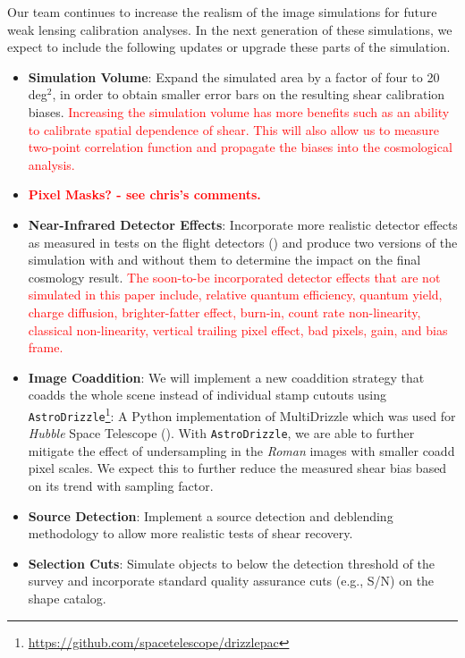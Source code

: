 \documentclass[fleqn,usenatbib]{mnras}
\begin{document}
Our team continues to increase the realism of the image simulations for future weak lensing calibration analyses. In the next generation of these simulations, we expect to include the following updates or upgrade these parts of the simulation. 
\begin{itemize}
    \setlength\itemsep{1em}
    \item \textbf{Simulation Volume}: Expand the simulated area by a factor of four to 20 \textrm{deg}$^{2}$, in order to obtain smaller error bars on the resulting shear calibration biases. \textcolor{red}{Increasing the simulation volume has more benefits such as an ability to calibrate spatial dependence of shear. This will also allow us to measure two-point correlation function and propagate the biases into the cosmological analysis. }
    
    \item \textcolor{red}{\textbf{Pixel Masks? - see chris's comments.}}
    
    \item \textbf{Near-Infrared Detector Effects}: Incorporate more realistic detector effects as measured in tests on the flight detectors (\citealt{2020JATIS...6d6001M}) and produce two versions of the simulation with and without them to determine the impact on the final cosmology result. \textcolor{red}{The soon-to-be incorporated detector effects that are not simulated in this paper include, relative quantum efficiency, quantum yield, charge diffusion, brighter-fatter effect, burn-in, count rate non-linearity, classical non-linearity, vertical trailing pixel effect, bad pixels, gain, and bias frame.} 
    
    \item \textbf{Image Coaddition}: We will implement a new coaddition strategy that coadds the whole scene instead of individual stamp cutouts using  \texttt{AstroDrizzle}\footnote{\url{https://github.com/spacetelescope/drizzlepac}}: A Python implementation of MultiDrizzle which was used for \emph{Hubble} Space Telescope (\citealt{2003hstc.conf..325B}). With \texttt{AstroDrizzle}, we are able to further mitigate the effect of undersampling in the \emph{Roman} images with smaller coadd pixel scales. We expect this to further reduce the measured shear bias based on its trend with sampling factor.
    
    \item \textbf{Source Detection}: Implement a source detection and deblending methodology to allow more realistic tests of shear recovery.
    
    \item \textbf{Selection Cuts}: Simulate objects to below the detection threshold of the survey and incorporate standard quality assurance cuts (e.g., S/N) on the shape catalog. 
\end{itemize}
\end{document}
